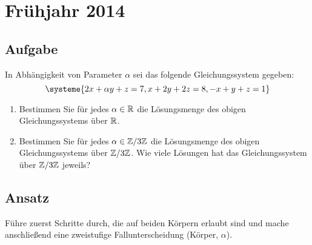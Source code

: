 \newpage


\section{Frühjahr 2014}

\subsection{Aufgabe}
In Abhängigkeit von Parameter \( \alpha \) sei das folgende Gleichungssystem gegeben:
\begin{equation*}
	\systeme{2x+\alpha y+z=7, x+2y+2z = 8, -x+y+z=1}
\end{equation*}
\begin{enumerate}
	\item Bestimmen Sie für jedes \( \alpha \in \mathbb{R} \) die Lösungsmenge des obigen Gleichungssystems über \( \mathbb{R} \).
	\item Bestimmen Sie für jedes \( \alpha \in \mathbb{Z}/3\mathbb{Z} \) die Lösungsmenge des obigen Gleichungssystems über \( \mathbb{Z}/3\mathbb{Z} \). Wie viele Lösungen hat das Gleichungssystem über \( \mathbb{Z}/3\mathbb{Z} \) jeweils?
\end{enumerate}

\subsection{Ansatz}
Führe zuerst Schritte durch, die auf beiden Körpern erlaubt sind und mache anschließend eine zweistufige Fallunterscheidung (Körper, \( \alpha \)).

